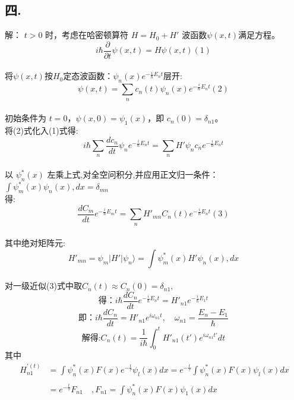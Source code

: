 \subsection{四.}
解：
$t > 0$ 时，考虑在哈密顿算符 $H = H_0 + H'$ 波函数$\psi(x,t)$满足方程。$$i\hbar \frac{\partial}{\partial t}\psi(x,t) = H \psi(x,t)(1)~$$\\
将$\psi(x,t)$按$H_0$定态波函数：$\psi_n(x) e^{-\frac{i}{\hbar} E_n t}$层开:\\
$$\psi(x,t) = \sum_{n} c_n(t) \psi_n(x) e^{-\frac{i}{\hbar} E_n t}(2)~$$\\
初始条件为 $t=0$，$\psi(x,0) = \psi_1(x)$，即 $c_n(0) = \delta_{n1}$。\\
将(2)式化入(1)式得:$$i\hbar \sum_n \frac{d c_n}{dt} \psi_n e^{-\frac{i}{\hbar} E_n t} = \sum_n H' \psi_n c_n e^{-\frac{i}{\hbar} E_n t}~$$\\
以 $\psi_n^*(x)$ 左乘上式,对全空问积分,并应用正文归一条件：$\int \psi_m^*(x) \psi_n(x) , dx = \delta_{mn}$\\
得: $$\frac{dC_m}{dt} e^{-\frac{i}{\hbar} E_m t} = \sum_n H'_{mn} C_n(t) e^{-\frac{i}{\hbar} E_n t}(3)~$$\\
其中绝对矩阵元:$$H'_{mn} = \psi_m | H' | \psi_n \rangle = \int \psi_m^*(x) H' \psi_n(x) , dx~$$\\
对一级近似(3)式中取$C_n(t) \approx C_n(0) = \delta_{n1},$
$$\text{得：}i\hbar\frac{dC_n}{dt} e^{-\frac{i}{\hbar} E_n t} = H'_{n1} e^{-\frac{i}{\hbar} E_1 t}~$$
$$\text{即：}i\hbar\frac{dC_n}{dt} = H'_{n1} e^{i\omega_{n1}t}, \quad \omega_{n1} = \frac{E_n - E_1}{\hbar}~$$
$$\text{解得:}C_n(t) = \frac{1}{i\hbar} \int_0^t H'_{n1}(t') e^{i\omega_{n1} t'} dt~$$
其中
\begin{align}
    H_{n1}^{'(t)} &= \int \psi_n^*(x) F(x) e^{-\frac{t}{\tau}} \psi_l(x) dx = e^{-\frac{t}{\tau}} \int \psi_n^*(x) F(x) \psi_l(x) dx \\\\
    &= e^{-\frac{t}{\tau}} F_{n1} \quad, F_{n1} = \int \psi_n^*(x) F(x) \psi_1(x) dx~
\end{align}

